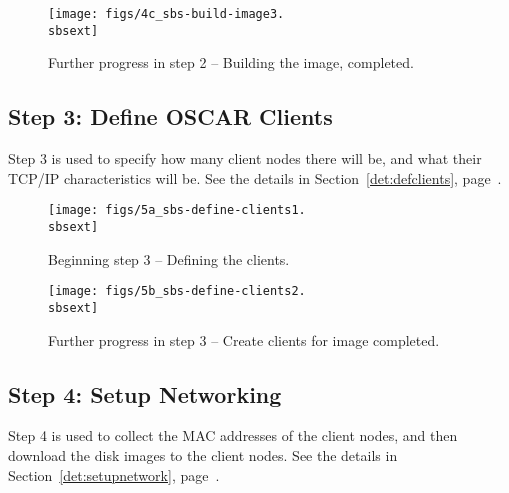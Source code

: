 \begin{figure}[htbp]
  \begin{center}
    \centerline{\texttt{[image: figs/4c\_sbs-build-image3.\\sbsext]}}
    \caption{Further progress in step 2 -- Building the image, completed.}
    \label{fig:sbs-build-image2}
  \end{center}
\end{figure}

\clearpage



\subsection{Step 3: Define OSCAR Clients}

Step 3 is used to specify how many client nodes there will be, and
what their TCP/IP characteristics will be.  See the details in
Section~\ref{det:defclients}, page~\pageref{det:defclients}.
 
\begin{figure}[h]
  \begin{center}
    \centerline{\texttt{[image: figs/5a\_sbs-define-clients1.\\sbsext]}}
    \caption{Beginning step 3 -- Defining the clients.}
    \label{fig:sbs-define-clients}
  \end{center}
\end{figure}

\begin{figure}[htbp]
  \begin{center}
    \centerline{\texttt{[image: figs/5b\_sbs-define-clients2.\\sbsext]}}
    \caption{Further progress in step 3 -- Create clients for image
      completed.}
    \label{fig:sbs-define-clients2}
  \end{center}
\end{figure}

\clearpage



\subsection{Step 4: Setup Networking}

Step 4 is used to collect the MAC addresses of the client nodes, and
then download the disk images to the client nodes.  See the details in
Section~\ref{det:setupnetwork}, page~\pageref{det:setupnetwork}.

